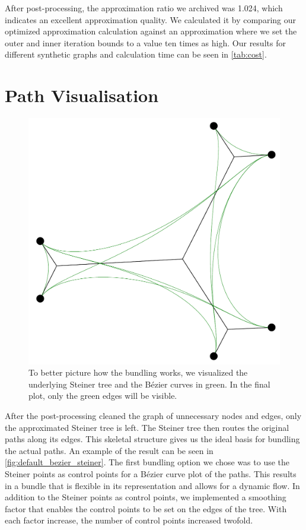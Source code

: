 After post-processing, the approximation ratio we archived was 1.024, which indicates an excellent approximation quality. We calculated it by comparing our optimized approximation calculation against an approximation where we set the outer and inner iteration bounds to a value ten times as high. Our results for different synthetic graphs and calculation time can be seen in \autoref{tab:cost}.

\section{Path Visualisation}
\label{sec:path_visualisation}

\begin{figure}[t]
  \centering
  \includegraphics[width=0.6\linewidth]{figures/default_bezier+steiner.pdf}
  \caption{To better picture how the bundling works, we visualized the underlying Steiner tree and the B\'{e}zier curves in green. In the final plot, only the green edges will be visible.}
  \label{fig:default_bezier_steiner}
\end{figure}

After the post-processing cleaned the graph of unnecessary nodes and edges, only the approximated Steiner tree is left. The Steiner tree then routes the original paths along its edges. This skeletal structure gives us the ideal basis for bundling the actual paths. An example of the result can be seen in \autoref{fig:default_bezier_steiner}. The first bundling option we chose was to use the Steiner points as control points for a B\'{e}zier curve plot of the paths. This results in a bundle that is flexible in its representation and allows for a dynamic flow. In addition to the Steiner points as control points, we implemented a smoothing factor that enables the control points to be set on the edges of the tree. With each factor increase, the number of control points increased twofold.

